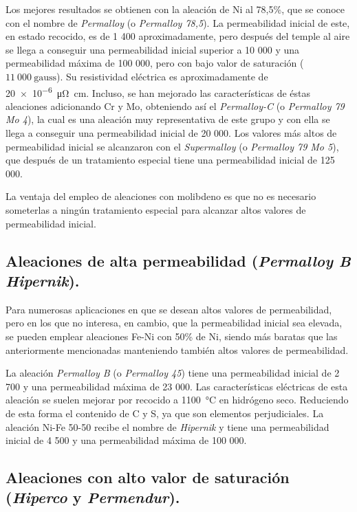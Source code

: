 \documentclass[12pt,a4paper]{article}
\begin{document}
Los mejores resultados se obtienen con la aleación de Ni al 78,5\%, que se conoce con el nombre de \textit{Permalloy} (o \textit{Permalloy 78,5}). La permeabilidad inicial de este, en estado recocido, es de 1 400 aproximadamente, pero después del temple al aire se llega a conseguir una permeabilidad inicial superior a 10 000 y una permeabilidad máxima de 100 000, pero con bajo valor de saturación ($11\ 000\ \mathrm{gauss}$). Su resistividad eléctrica es aproximadamente de \SI{20e-6}{\micro\ohm\centi\metre}. Incluso, se han mejorado las características de éstas aleaciones adicionando Cr y Mo, obteniendo así el \textit{Permalloy-C} (o \textit{Permalloy 79 Mo 4}), la cual es una aleación muy representativa de este grupo y con ella se llega a conseguir una permeabilidad inicial de 20 000. Los valores más altos de permeabilidad inicial se alcanzaron con el \textit{Supermalloy} (o \textit{Permalloy 79 Mo 5}), que después de un tratamiento especial tiene una permeabilidad inicial de 125 000.

La ventaja del empleo de aleaciones con molibdeno es que no es necesario someterlas a ningún tratamiento especial para alcanzar altos valores de permeabilidad inicial.

\subsection{Aleaciones de alta permeabilidad (\textit{Permalloy B Hipernik}).}

Para numerosas aplicaciones en que se desean altos valores de permeabilidad, pero en los que no interesa, en cambio, que la permeabilidad inicial sea elevada, se pueden emplear aleaciones Fe-Ni con 50\% de Ni, siendo más baratas que las anteriormente mencionadas manteniendo también altos valores de permeabilidad.

La aleación \textit{Permalloy B} (o \textit{Permalloy 45}) tiene una permeabilidad inicial de 2 700 y una permeabilidad máxima de 23 000. Las características eléctricas de esta aleación se suelen mejorar por recocido a \SI{1 100}{\celsius} en hidrógeno seco. Reduciendo de esta forma el contenido de C y S, ya que son elementos perjudiciales. La aleación Ni-Fe 50-50 recibe el nombre de \textit{Hipernik} y tiene una permeabilidad inicial de 4 500 y una permeabilidad máxima de 100 000.

\subsection{Aleaciones con alto valor de saturación (\textit{Hiperco} y \textit{Permendur}).}
\end{document}
